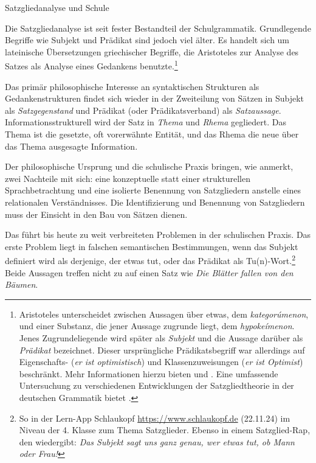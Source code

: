 \begin{Exkurs}{Satzgliedanalyse und Schule}
\label{ExkursSatzgliedanalyseSchule}

Die Satzgliedanalyse ist seit \citet{Becker1837} fester Bestandteil der Schulgrammatik. Grundlegende Begriffe wie Subjekt und Prädikat sind jedoch viel älter. Es handelt sich um lateinische Übersetzungen griechischer Begriffe, die Aristoteles zur Analyse des Satzes als Analyse eines Gedankens benutzte.\footnote{Aristoteles unterscheidet zwischen Aussagen über etwas, dem \textit{kategorúmenon}, und einer Substanz, die jener Aussage zugrunde liegt, dem \textit{hypokeímenon}. Jenes Zugrundeliegende wird später als \textit{Subjekt} und die Aussage darüber als \textit{Prädikat} bezeichnet. Dieser ursprüngliche Prädikatsbegriff war allerdings auf Eigenschafts- (\textit{er ist optimistisch}) und Klassenzuweisungen (\textit{er ist Optimist}) beschränkt. Mehr Informationen hierzu bieten \citet[17--19]{Glinz1947} und \citet[149--151]{Jacob2021}. Eine umfassende Untersuchung zu verschiedenen Entwicklungen der Satzgliedtheorie in der deutschen Grammatik bietet \citet{Piitulainen1980}.} 

Das primär philosophische Interesse an syntaktischen Strukturen als Gedankenstrukturen findet sich wieder in der Zweiteilung von Sätzen in Subjekt als \textit{Satzgegenstand} und Prädikat (oder Prädikatsverband) als \textit{Satzaussage}. Informationsstrukturell wird der Satz in \textit{Thema} und \textit{Rhema} gegliedert. Das Thema ist die gesetzte, oft vorerwähnte Entität, und das Rhema die neue über das Thema ausgesagte Information. 

Der philosophische Ursprung und die schulische Praxis bringen, wie \citet[25]{Welke2014} anmerkt, zwei Nachteile mit sich: eine konzeptuelle statt einer strukturellen Sprachbetrachtung und eine isolierte Benennung von Satzgliedern anstelle eines relationalen Verständnisses. Die Identifizierung und Benennung von Satzgliedern muss der Einsicht in den Bau von Sätzen dienen.

Das führt bis heute zu weit verbreiteten Problemen in der schulischen Praxis. Das erste Problem liegt in falschen semantischen Bestimmungen, \zB wenn das Subjekt definiert wird als derjenige, der etwas tut, oder das Prädikat als Tu(n)-Wort.\footnote{So \zB in der Lern-App Schlaukopf \url{ https://www.schlaukopf.de} (22.11.24) im Niveau der 4. Klasse zum Thema Satzglieder. Ebenso in einem Satzglied-Rap, den \citet[127]{Hennig2011SGLingSchule} wiedergibt: \textit{Das Subjekt sagt uns ganz genau, wer etwas tut, ob Mann oder Frau!}} Beide Aussagen treffen nicht zu auf einen Satz wie \textit{Die Blätter fallen von den Bäumen}. 


\end{Exkurs}
